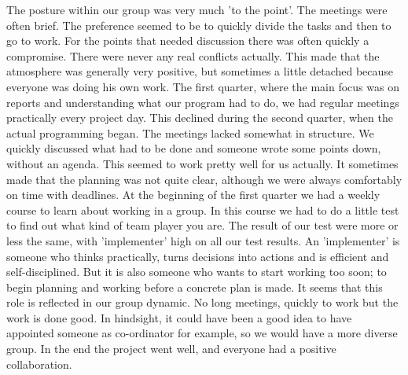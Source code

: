 The posture within our group was very much 'to the point'. The meetings were often brief. The preference seemed to be to quickly divide the tasks and then to go to work. For the points that needed discussion there was often quickly a compromise. There were never any real conflicts actually. This made that the atmosphere was generally very positive, but sometimes a little detached because everyone was doing his own work.
The first quarter, where the main focus was on reports and understanding what our program had to do, we had regular meetings practically every project day. This declined during the second quarter, when the actual programming began. The meetings lacked somewhat in structure. We quickly discussed what had to be done and someone wrote some points down, without an agenda. This seemed to work pretty well for us actually. It sometimes made that the planning was not quite clear, although we were always comfortably on time with deadlines.
At the beginning of the first quarter we had a weekly course to learn about working in a group. In this course we had to do a little test to find out what kind of team player you are. The result of our test were more or less the same, with 'implementer' high on all our test results. An 'implementer' is someone who thinks practically, turns decisions into actions and is efficient and self-disciplined. But it is also someone who wants to start working too soon; to begin planning and working before a concrete plan is made. It seems that this role is reflected in our group dynamic. No long meetings, quickly to work but the work is done good. In hindsight, it could have been a good idea to have appointed someone as co-ordinator for example, so we would have a more diverse group.
In the end the project went well, and everyone had a positive collaboration.